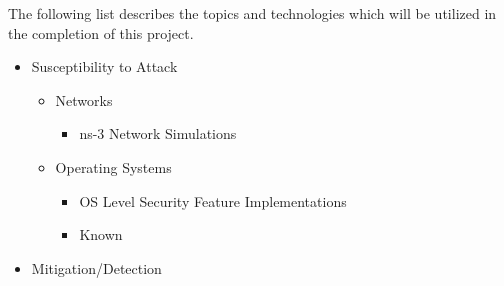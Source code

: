 The following list describes the topics and technologies which will be utilized
in the completion of this project.

\begin{itemize}
	\item Susceptibility to Attack
	\begin{itemize}
		\item Networks
		\begin{itemize}
			\item ns-3 Network Simulations
		\end{itemize}
		\item Operating Systems
		\begin{itemize}
			\item OS Level Security Feature Implementations
			\item Known
		\end{itemize}
	\end{itemize}
	\item Mitigation/Detection
\end{itemize}
